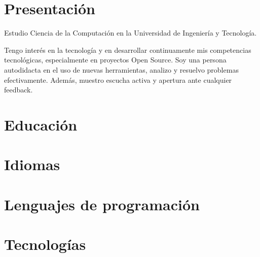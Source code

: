 \documentclass[10pt, a4paper]{moderncv}
\begin{document}
\maketitle
\section{Presentación}
Estudio Ciencia de la Computación en la Universidad de Ingeniería y Tecnología.

Tengo interés en la tecnología y en desarrollar continuamente mis competencias tecnológicas, especialmente en proyectos Open Source.
Soy una persona autodidacta en el uso de nuevas herramientas, analizo y resuelvo problemas efectivamente.
Además, muestro escucha activa y apertura ante cualquier feedback.

\section{Educación}

\section{Idiomas}


\section{Lenguajes de programación}

\section{Tecnologías}
\end{document}
